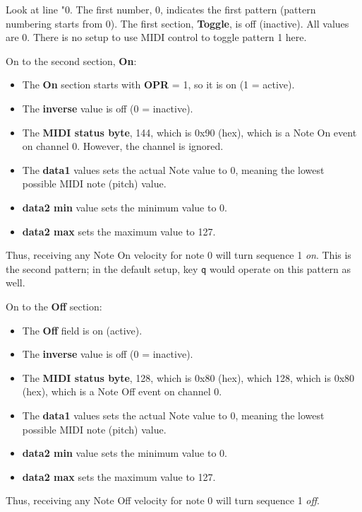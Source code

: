    Look at line "0.
   The first number, 0, indicates the first pattern (pattern numbering starts
   from 0).
   The first section, \textbf{Toggle}, is off (inactive).  All values are 0.
   There is no setup to use MIDI control to toggle pattern 1 here.
   
   On to the second section, \textbf{On}:

   \begin{itemize}
      \item The \textbf{On} section starts with \textbf{OPR} = 1,
         so it is on (1 = active).
      \item The \textbf{inverse} value is off (0 = inactive).
      \item The \textbf{MIDI status byte}, 144, which is 0x90 (hex), which
         is a Note On event on channel 0.  However, the channel is ignored.
      \item The \textbf{data1} values sets the actual Note value to 0,
         meaning the lowest possible MIDI note (pitch) value.
      \item \textbf{data2 min} value sets the minimum value to 0.
      \item \textbf{data2 max} sets the maximum value to 127.
   \end{itemize}

   Thus, receiving any Note On velocity for note 0 will turn sequence
   1 \textsl{on}.  This is the second pattern; in the default setup, key
   \texttt{q} would operate on this pattern as well.
   
   On to the \textbf{Off} section:

   \begin{itemize}
      \item The \textbf{Off} field is on (active).
      \item The \textbf{inverse} value is off (0 = inactive).
      \item The \textbf{MIDI status byte}, 128, which is 0x80 (hex), which
         128, which is 0x80 (hex), which is a Note Off event on channel 0.
      \item The \textbf{data1} values sets the actual Note value to 0,
         meaning the lowest possible MIDI note (pitch) value.
      \item \textbf{data2 min} value sets the minimum value to 0.
      \item \textbf{data2 max} sets the maximum value to 127.
   \end{itemize}

   Thus, receiving any Note Off velocity for note 0 will turn sequence
   1 \textsl{off}.

